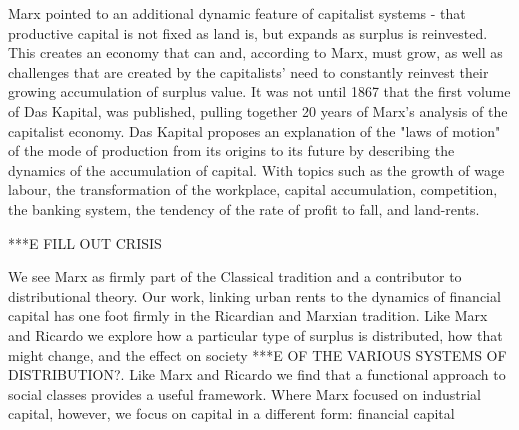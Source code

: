 Marx pointed to an additional dynamic feature of  capitalist systems - that productive capital is not fixed as land is, but  expands as surplus is reinvested. This creates an economy that can and, according to Marx, must grow, as well as challenges that are created by the capitalists' need to constantly reinvest their growing accumulation of surplus value. It was not until 1867 that  the first volume of Das Kapital,  was published, pulling together 20 years of Marx's analysis of the capitalist economy.  Das Kapital proposes an explanation of the "laws of motion" of the mode of production from its origins to its future by describing the dynamics of the accumulation of capital. With topics such as the growth of wage labour, the transformation of the workplace, capital accumulation, competition, the banking system, the tendency of the rate of profit to fall, and land-rents.%

***E FILL OUT CRISIS %


We see Marx as firmly part of the Classical tradition and a contributor to distributional theory.  Our work, linking urban rents to the dynamics of financial capital has one foot firmly  in the Ricardian and Marxian  tradition. Like Marx and Ricardo we explore how a particular type of surplus is distributed, how that might change, and the effect on society ***E OF THE VARIOUS SYSTEMS OF DISTRIBUTION?. Like Marx and Ricardo we find that a functional approach to social classes provides a useful framework. Where Marx focused on industrial \gls{capital}, however, we focus on capital in a different form: \gls{financial capital}%

